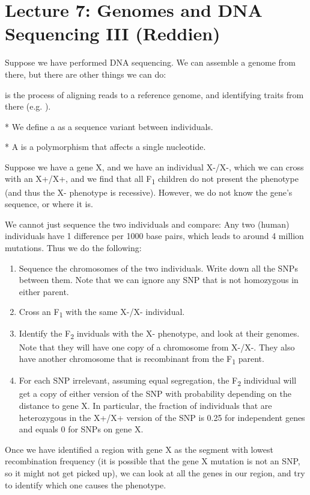 \section*{Lecture 7: Genomes and DNA Sequencing III (Reddien)}

Suppose we have performed DNA sequencing. We can assemble a genome from there, but there are other things we can do:

\begin{defn}
	 is the process of aligning reads to a reference genome, and identifying traits from there (e.g. ).
\end{defn}

\begin{defn}*
	We define a  as a sequence variant between individuals. 
\end{defn}

\begin{exm}*
	A  is a polymorphism that affects a single nucleotide.
\end{exm}

\begin{exper}
	Suppose we have a gene X, and we have an individual X\tss-/X\tss-, which we can cross with an X\tss+/X\tss+, and we find that all F\textsubscript1 children do not present the phenotype (and thus the X\tss- phenotype is recessive).
	However, we do not know the gene's sequence, or where it is.

	We cannot just sequence the two individuals and compare: Any two (human) individuals have 1 difference per 1000 base pairs, which leads to around 4 million mutations. Thus we do the following:
	\begin{enumerate}
		\item Sequence the chromosomes of the two individuals. Write down all the SNPs between them. Note that we can ignore any SNP that is not homozygous in either parent.
		\item Cross an F\textsubscript1 with the same X\tss-/X\tss- individual.
		\item Identify the F\textsubscript2 inviduals with the X\tss- phenotype, and look at their genomes. Note that they will have one copy of a chromosome from X\tss-/X\tss-. They also have another chromosome that is recombinant from the F\textsubscript1 parent.
		\item For each SNP irrelevant, assuming equal segregation, the F\textsubscript2 individual will get a copy of either version of the SNP with probability depending on the distance to gene X. In particular, the fraction of individuals that are heterozygous in the X\tss+/X\tss+ version of the SNP is 0.25 for independent genes and equals 0 for SNPs on gene X.
	\end{enumerate}
	Once we have identified a region with gene X as the segment with lowest recombination frequency (it is possible that the gene X mutation is not an SNP, so it might not get picked up), we can look at all the genes in our region, and try to identify which one causes the phenotype.
\end{exper}
